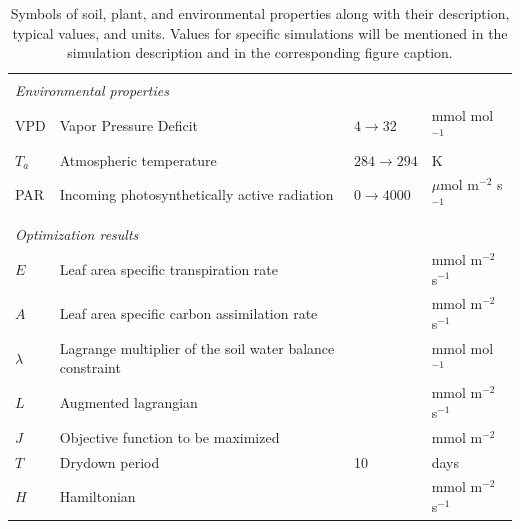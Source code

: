 \documentclass[utf8]{frontiersSCNS} %
\begin{document}
\begin{table}[h]
\begin{tabular}{l l l l}
        \hline
        \multicolumn{4}{l}{}\\
        \multicolumn{4}{l}{\textit{Environmental properties}}\\
        \hline
        VPD & Vapor Pressure Deficit & $4 \rightarrow 32$ & mmol mol$^{-1}$\\
        $T_a$ & Atmospheric temperature & $284 \rightarrow 294$ & K \\
        PAR & Incoming photosynthetically active radiation & $0 \rightarrow 4000$ & $\mu$mol m$^{-2}$ s$^{-1}$ \\
        \hline
        \multicolumn{4}{l}{}\\
        \multicolumn{4}{l}{\textit{Optimization results}}\\
        \hline
        $E$ & Leaf area specific transpiration rate & & mmol m$^{-2}$ s$^{-1}$\\
        $A$ & Leaf area specific carbon assimilation rate & & mmol m$^{-2}$ s$^{-1}$\\
        $\lambda$ & Lagrange multiplier of the soil water balance constraint & & mmol mol$^{-1}$\\
        $L$ & Augmented lagrangian & & mmol m$^{-2}$ s$^{-1}$\\
        $J$ & Objective function to be maximized & & mmol m$^{-2}$\\
        $T$ & Drydown period & 10 & days\\
        $H$ & Hamiltonian & & mmol m$^{-2}$ s$^{-1}$\\
    \end{tabular}
    \caption{Symbols of soil, plant, and environmental properties along with their description, typical values, and units. Values for specific simulations will be mentioned in the simulation description and in the corresponding figure caption.}
    \label{tab:props}
\end{table}



\end{document}
